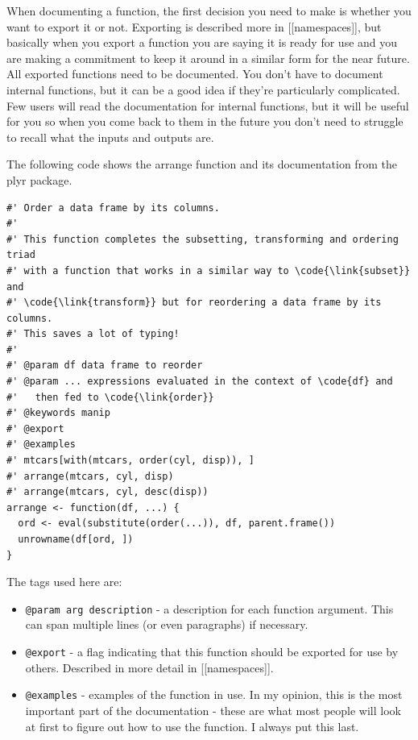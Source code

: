 When documenting a function, the first decision you need to make is
whether you want to export it or not. Exporting is described more in
{[}{[}namespaces{]}{]}, but basically when you export a function you are
saying it is ready for use and you are making a commitment to keep it
around in a similar form for the near future. All exported functions
need to be documented. You don't have to document internal functions,
but it can be a good idea if they're particularly complicated. Few users
will read the documentation for internal functions, but it will be
useful for you so when you come back to them in the future you don't
need to struggle to recall what the inputs and outputs are.

The following code shows the arrange function and its documentation from
the plyr package.

\begin{verbatim}
#' Order a data frame by its columns.
#'
#' This function completes the subsetting, transforming and ordering triad
#' with a function that works in a similar way to \code{\link{subset}} and 
#' \code{\link{transform}} but for reordering a data frame by its columns.
#' This saves a lot of typing!
#'
#' @param df data frame to reorder
#' @param ... expressions evaluated in the context of \code{df} and 
#'   then fed to \code{\link{order}}
#' @keywords manip
#' @export
#' @examples
#' mtcars[with(mtcars, order(cyl, disp)), ]
#' arrange(mtcars, cyl, disp)
#' arrange(mtcars, cyl, desc(disp))
arrange <- function(df, ...) {
  ord <- eval(substitute(order(...)), df, parent.frame())
  unrowname(df[ord, ])
}
\end{verbatim}

The tags used here are:

\begin{itemize}
\item
  \texttt{@param arg description} - a description for each function
  argument. This can span multiple lines (or even paragraphs) if
  necessary.
\item
  \texttt{@export} - a flag indicating that this function should be
  exported for use by others. Described in more detail in
  {[}{[}namespaces{]}{]}.
\item
  \texttt{@examples} - examples of the function in use. In my opinion,
  this is the most important part of the documentation - these are what
  most people will look at first to figure out how to use the function.
  I always put this last.
\end{itemize}

